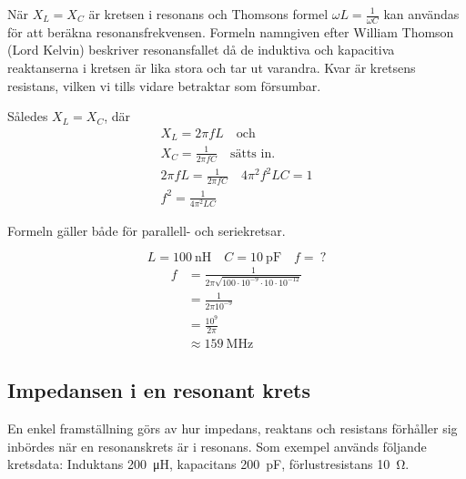 När \(X_L = X_C\) är kretsen i resonans och Thomsons formel
\(\omega L = \frac{1}{\omega C}\) kan användas för att beräkna
resonansfrekvensen.
Formeln namngiven efter William Thomson (Lord Kelvin) beskriver resonansfallet
då de induktiva och kapacitiva reaktanserna i kretsen är lika stora och tar ut
varandra.
Kvar är kretsens resistans, vilken vi tills vidare betraktar som försumbar.

Således \(X_L = X_C\), där
%
\begin{gather*}
  X_L = 2\pi fL \quad \text{och} \\
  X_C = \frac{1}{2\pi fC} \quad \text{sätts in.} \\
  2\pi fL = \frac{1}{2\pi fC} \quad 4\pi ^2f^2LC = 1 \\
  f^2 = \frac{1}{4\pi ^2LC}
\end{gather*}

Formeln gäller både för parallell- och seriekretsar.

\vspace*{1ex}
\begin{exempelbox}
\noindent
\[L = \qty{100}{\nano\henry} \quad C = \qty{10}{\pico\farad} \quad f =\ ?\]
\tcblower
\vspace{-\baselineskip}
\begin{align*}
  f &= \frac{1}{2\pi \sqrt{100 \cdot 10^{-9} \cdot 10 \cdot 10^{-12}}} \\
  &= \frac{1}{2\pi 10^{-9}} \\
  &= \frac{10^9}{2\pi } \\
  &\approx \qty{159}{\mega\hertz}
\end{align*}
\end{exempelbox}

\subsection{Impedansen i en resonant krets}
\label{impedans_resonant_krets}


En enkel framställning görs av hur impedans, reaktans och resistans förhåller
sig inbördes när en resonanskrets är i resonans.
Som exempel används följande kretsdata: Induktans \qty{200}{\micro\henry},
kapacitans \qty{200}{\pico\farad}, förlustresistans \qty{10}{\ohm}.

